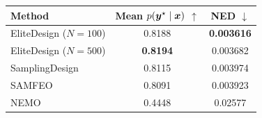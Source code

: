 \begin{minipage}[t]{0.48\textwidth}
\centering\small
\renewcommand{\arraystretch}{1.05}
\begin{tabular}{lcc}
\toprule
\textbf{Method} & \shortstack{\textbf{Mean}\\\boldmath$p(\boldsymbol{{y}}^\star\mid\boldsymbol{{x}})$ $\uparrow$} & \shortstack{\textbf{NED}\\$\downarrow$} \\
\midrule
EliteDesign ($N=100$) & 0.8188 & \textbf{0.003616} \\
EliteDesign ($N=500$) & \textbf{0.8194} & 0.003682 \\
\midrule
SamplingDesign & 0.8115 & 0.003974 \\
SAMFEO & 0.8091 & 0.003923 \\
NEMO & 0.4448 & 0.02577 \\
\bottomrule
\end{tabular}
\label{tab:supp-rfam}
\end{minipage}
